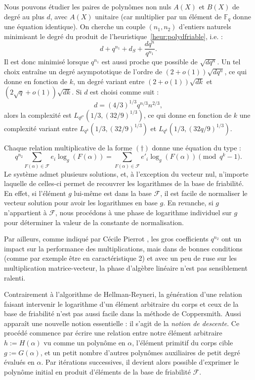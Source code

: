 \documentclass[a4paper, titlepage, 11pt]{article}
\theoremstyle{definition}
\theoremstyle{remark}
\def\o{o}
\def\gf #1{\mathbb{F}_{#1}}
\begin{document}
Nous pouvons étudier les paires de polynômes non nuls $A(X)$ et $B(X)$ de degré au plus $d$, avec $A(X)$ unitaire (car multiplier par un élément de $\gf{q}$ donne une équation identique). On cherche un couple $(n_1, n_2)$ d'entiers naturels minimisant le degré du produit de l'heuristique~\ref{heur:polydfriable}, i.e. :
$$d + q^{n_1} + d_S + \frac{dq^n}{q^{n_1}}.$$
Il est donc minimisé lorsque $q^{n_1}$ est aussi proche que possible de $\sqrt{dq^n}$. Un tel choix entraîne un degré asympototique de l'ordre de $(2+\o(1))\sqrt{dq^n}$, ce qui donne en fonction de $k$, un degré variant entre $(2+\o(1))\sqrt{dk}$ et $(2\sqrt{q}+\o(1))\sqrt{dk}$.
Si $d$ est choisi comme suit :
$$d = (4/3)^{1/3}q^{n/3}n^{2/3},$$
alors la complexité est $L_{q^{q^n}}(1/3, (32/9)^{1/3})$, ce qui donne en fonction de $k$ une complexité variant entre $L_{q^k}(1/3, (32/9)^{1/3})$ et $L_{q^k}(1/3, (32q/9)^{1/3})$.

Chaque relation multiplicative de la forme $(\dagger)$ donne une équation du type :
$$q^{n_2} \sum_{F(\alpha) \in \mathcal{F}} e_i \log_g(F(\alpha)) = \sum_{F(\alpha) \in \mathcal{F}} e'_i \log_g(F(\alpha)) \pmod{q^k-1}.$$
Le système admet plusieurs solutions, et, à l'exception du vecteur nul, n'importe laquelle de celles-ci permet de recouvrer les logarithmes de la base de friabilité. En effet, si l'élément $g$ lui-même est dans la base $\mathcal{F}$, il est facile de normaliser le vecteur solution pour avoir les logarithmes en base $g$. En revanche, si $g$ n'appartient à $\mathcal{F}$, nous procédons à une phase de logarithme individuel sur $g$ pour déterminer la valeur de la constante de normalisation.

Par ailleurs, comme indiqué par Cécile Pierrot \cite{pierrot2016}, les gros coefficients $q^{n_2}$ ont un impact sur la performance des multiplications, mais dans de bonnes conditions (comme par exemple être en caractéristique 2) et avec un peu de ruse sur les multiplication matrice-vecteur, la phase d'algèbre linéaire n'est pas sensiblement ralenti.

Contrairement à l'algorithme de Hellman-Reyneri, la génération d'une relation faisant intervenir le logarithme d'un élément arbitraire du corps et ceux de la base de friabilité n'est pas aussi facile dans la méthode de Coppersmith. Aussi apparaît une nouvelle notion essentielle : il s'agit de la \textit{notion de descente}. Ce procédé commence par écrire une relation entre notre élément arbitraire $h := H(\alpha)$ vu comme un polynôme en $\alpha$, l'élément primitif du corps cible $g := G(\alpha)$, et un petit nombre d'autres polynômes auxiliaires de petit degré évalués en $\alpha$. Par itérations successives, il devient alors possible d'exprimer le polynôme initial en produit d'éléments de la base de friabilité $\mathcal{F}$.
\end{document}

